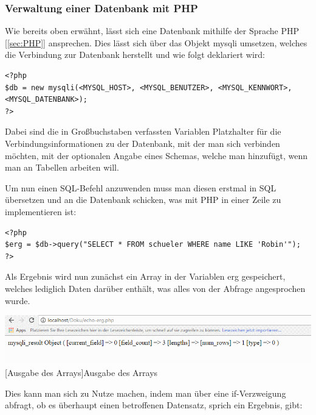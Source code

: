 \documentclass[12pt,a4paper,bibliography=totocnumbered,listof=totocnumbered]{scrartcl}
\begin{document}
\subsubsection{Verwaltung einer Datenbank mit PHP}
\label{sec:SQL-PHP}
Wie bereits oben erwähnt, lässt sich eine Datenbank mithilfe der Sprache PHP [\ref{sec:PHP}] ansprechen.
Dies lässt sich über das Objekt \glqq mysqli\grqq{} umsetzen, welches die Verbindung zur Datenbank herstellt und wie folgt deklariert wird:

\vspace{1em}
\begin{lstlisting}[caption= SQL PHP Mysqli, label=lst:sql-php-mysqli]
<?php
$db = new mysqli(<MYSQL_HOST>, <MYSQL_BENUTZER>, <MYSQL_KENNWORT>, <MYSQL_DATENBANK>);
?>
\end{lstlisting}

Dabei sind die in Großbuchstaben verfassten Variablen Platzhalter für die Verbindungsinformationen zu der Datenbank, mit der man sich verbinden möchten, mit der optionalen Angabe eines Schemas, welche man hinzufügt, wenn man an Tabellen arbeiten will.

Um nun einen SQL-Befehl anzuwenden muss man diesen erstmal in SQL übersetzen und an die Datenbank schicken, was mit PHP in einer Zeile zu implementieren ist:

\vspace{1em}
\begin{lstlisting}[caption= SQL PHP Mysqli, label=lst:sql-php-mysqli]
<?php
$erg = $db->query("SELECT * FROM schueler WHERE name LIKE 'Robin'");
?>
\end{lstlisting}

Als Ergebnis wird nun zunächst ein Array in der Variablen \glqq erg\grqq{} gespeichert, welches lediglich Daten darüber enthält, was alles von der Abfrage angesprochen wurde.

\vspace{1em}
\begin{minipage}{\linewidth}
	\centering
	\includegraphics[width=0.7\linewidth]{Bilder/sql-php-print-erg.png}
	[Ausgabe des Arrays]{Ausgabe des Arrays}
	\label{fig:arrayausgabe}
\end{minipage}


Dies kann man sich zu Nutze machen, indem man über eine if-Verzweigung abfragt, ob es überhaupt einen betroffenen Datensatz, sprich ein Ergebnis, gibt:
\end{document}
